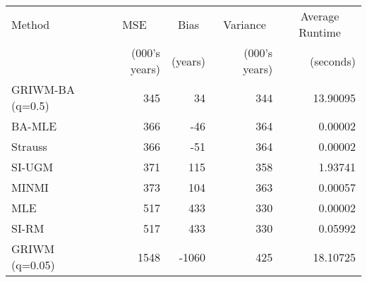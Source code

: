 
\begin{tabular}{lrrrr}
\toprule
\multicolumn{1}{l}{Method} & \multicolumn{1}{c}{MSE} & \multicolumn{1}{c}{Bias} & \multicolumn{1}{c}{Variance} & \multicolumn{1}{c}{Average Runtime} \\
 & (000's years) & (years) & (000's years) & (seconds)\\
\midrule
GRIWM-BA (q=0.5) & 345 & 34 & 344 & 13.90095\\
BA-MLE & 366 & -46 & 364 & 0.00002\\
Strauss & 366 & -51 & 364 & 0.00002\\
SI-UGM & 371 & 115 & 358 & 1.93741\\
MINMI & 373 & 104 & 363 & 0.00057\\
\addlinespace
MLE & 517 & 433 & 330 & 0.00002\\
SI-RM & 517 & 433 & 330 & 0.05992\\
GRIWM (q=0.05) & 1548 & -1060 & 425 & 18.10725\\
\bottomrule
\end{tabular}
